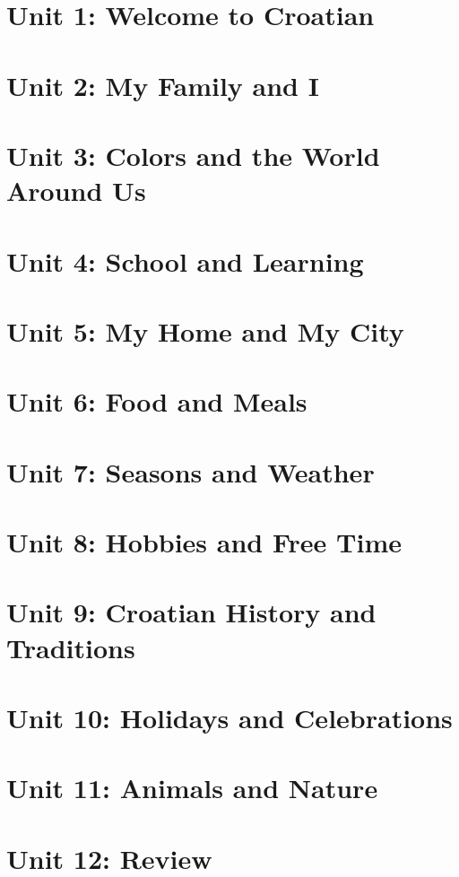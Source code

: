 
\section{Unit 1: Welcome to Croatian}

\section{Unit 2: My Family and I}

\section{Unit 3: Colors and the World Around Us}

\section{Unit 4: School and Learning}

\section{Unit 5: My Home and My City}

\section{Unit 6: Food and Meals}

\section{Unit 7: Seasons and Weather}

\section{Unit 8: Hobbies and Free Time}

\section{Unit 9: Croatian History and Traditions}

\section{Unit 10: Holidays and Celebrations}

\section{Unit 11: Animals and Nature}

\section{Unit 12: Review}
